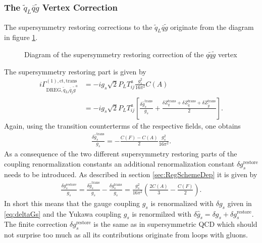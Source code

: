 \subsubsection*{The $\tilde{q}_L\overline{q}\tilde{g}$ Vertex Correction}
The supersymmetry restoring corrections to the $\tilde{q}_L \overline{q}\tilde{g}$ originate from the diagram in figure \ref{fig:YukawaCT}.
\begin{figure}[!htbp]
\begin{center}
\caption{Diagram of the supersymmetry restoring correction of  the $q\tilde{q}\tilde{g}$ vertex}\label{fig:YukawaCT}
\end{center}
\end{figure}
The supersymmetry restoring part is given by
\begin{align}
i\Gamma^{\mathrm{(1),ct,trans}}_{\mathrm{DREG}, \tilde{q}_{Li}\overline{q}_j\tilde{g}^a} &= -ig_s \sqrt{2} P_L T^a_{ij}  \frac{g_s^2}{16\pi^2}C(A)\\
&= -ig_s \sqrt{2} P_L T^a_{ij}  \left[ \frac{\delta \hat{g}_s^{\mathrm{trans}}}{g_s} + \frac{\delta Z^{\mathrm{trans}}_q + \delta Z^{\mathrm{trans}}_{\tilde{q}} + \delta Z^{\mathrm{trans}}_{\tilde{g}}}{2} \right].
\end{align}
Again, using the transition counterterms of the respective fields, one obtains
\begin{align}
\frac{\delta \hat{g}_s^{\mathrm{trans}}}{g_s} = -\frac{C(F)-C(A)}{2} \frac{g_s^2}{16\pi^2}.
\end{align}
As a consequence of the two different supersymmetry restoring parts of the coupling renormalization constants an additional renormalization constant $\delta g_s^{\mathrm{restore}}$ needs to be introduced. As described in section \ref{sec:RegSchemeDep} it is given by
\begin{align}
\frac{\delta g_s^{\mathrm{restore}}}{g_s} = \frac{\delta \hat{g}_s^{\mathrm{trans}}}{g_s} -\frac{\delta g_s^{\mathrm{trans}}}{g_s} = \frac{g_s^2}{16\pi^2}\left( \frac{2C(A)}{3} - \frac{C(F)}{2} \right).
\end{align}
In short this means that the gauge coupling $g_s$ is renormalized with $\delta g_s$ given in \eqref{eq:deltaGs} and the Yukawa coupling $\hat{g}_s$ is renormilzed with $\delta \hat{g}_s = \delta g_s + \delta g_s^{\mathrm{restore}}$.\\
The finite correction $\delta g_s^{\mathrm{restore}}$ is the same as in supersymmetric QCD which should not surprise too much as all its contributions originate from loops with gluons.%


